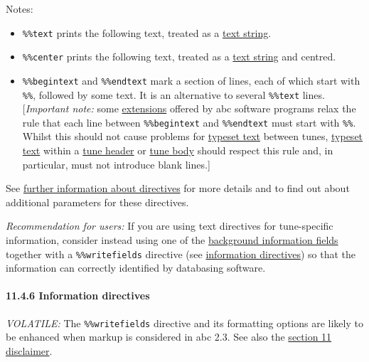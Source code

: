 \documentclass[oneside]{book}
\let\oldparagraph\paragraph
\renewcommand{\paragraph}[1]{\oldparagraph{#1}\mbox{}}
\begin{document}
Notes:

\begin{itemize}
\item
  \texttt{\%\%text} prints the following text, treated as a
  \protect\hyperlink{text_string_definition}{text string}.
\item
  \texttt{\%\%center} prints the following text, treated as a
  \protect\hyperlink{text_string_definition}{text string} and centred.
\item
  \texttt{\%\%begintext} and \texttt{\%\%endtext} mark a section of
  lines, each of which start with \texttt{\%\%}, followed by some text.
  It is an alternative to several \texttt{\%\%text} lines.
  {[}\emph{Important note:} some
  \protect\hyperlink{abc_extensions}{extensions} offered by abc software
  programs relax the rule that each line between \texttt{\%\%begintext}
  and \texttt{\%\%endtext} must start with \texttt{\%\%}. Whilst this
  should not cause problems for
  \protect\hyperlink{typeset_text_definition}{typeset text} between
  tunes, \protect\hyperlink{typeset_text_definition}{typeset text}
  within a \protect\hyperlink{tune_header_definition}{tune header} or
  \protect\hyperlink{tune_body_definition}{tune body} should respect
  this rule and, in particular, must not introduce blank lines.{]}
\end{itemize}

See \protect\hyperlink{further_information_about_directives}{further
information about directives} for more details and to find out about
additional parameters for these directives.

\emph{Recommendation for users:} If you are using text directives for
tune-specific information, consider instead using one of the
\protect\hyperlink{bdfsbackground_information}{background information
fields} together with a \texttt{\%\%writefields} directive (see
\protect\hyperlink{information_directives}{information directives}) so
that the information can correctly identified by databasing software.

\hypertarget{information_directives}{\paragraph{11.4.6 Information
directives}\label{information_directives}}

\emph{VOLATILE:} The \texttt{\%\%writefields} directive and its
formatting options are likely to be enhanced when markup is considered
in abc 2.3. See also the \protect\hyperlink{disclaimer}{section 11
disclaimer}.
\end{document}
